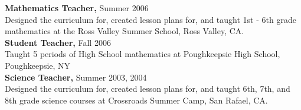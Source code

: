 \documentclass{res}
\begin{document}
\begin{resume}
   {\bf Mathematics Teacher, } Summer 2006 \\
   		Designed the curriculum for, created lesson plans for, and taught 1st - 6th grade 
   		mathematics at the Ross Valley Summer School, Ross Valley, CA. \\
   	
   {\bf Student Teacher, } Fall 2006 \\
   		Taught 5 periods of High School mathematics at Poughkeepsie High School, Poughkeepsie, NY \\
   	
   {\bf Science Teacher, } Summer 2003, 2004 \\
   		Designed the curriculum for, created lesson plans for, and taught 6th, 7th, and 8th grade 
   		science courses at Crossroads Summer Camp, San Rafael, CA.


\end{resume}
\end{document}
